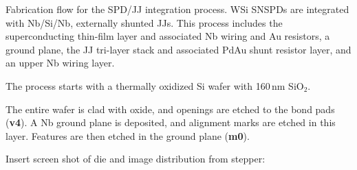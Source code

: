 Fabrication flow for the SPD/JJ integration process. WSi SNSPDs are integrated with Nb/Si/Nb, externally shunted JJs. This process includes the superconducting thin-film layer and associated Nb wiring and Au resistors, a ground plane, the JJ tri-layer stack and associated PdAu shunt resistor layer, and an upper Nb wiring layer.

The process starts with a thermally oxidized Si wafer with 160\,nm SiO$_2$. 

The entire wafer is clad with oxide, and openings are etched to the bond pads (\textbf{v4}). A Nb ground plane is deposited, and alignment marks are etched in this layer. Features are then etched in the ground plane (\textbf{m0}).

\vspace{2em}\noindent Insert screen shot of die and image distribution from stepper:
